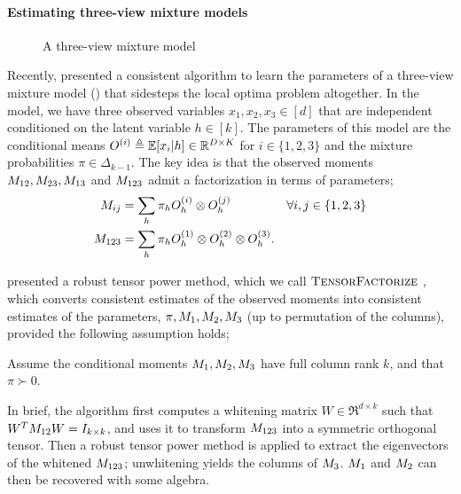 \paragraph{Estimating three-view mixture models}

\begin{figure}[t]
  \label{fig:three-view}
  \centering
  
  \caption{A three-view mixture model}
\end{figure}

Recently, \citet{anandkumar12moments} presented a consistent algorithm
  to learn the parameters of a three-view mixture model
  () that sidesteps the local optima problem
  altogether. 
In the model, we have three observed variables $x_1, x_2, x_3 \in [d]$
  that are independent conditioned on the latent variable $h \in [k]$. 
  The parameters of this model are the conditional means $O^{(i)} \triangleq
  \mathbb{E}[x_i | h] \in \mathbb{R}^{D \times K}$ for $i \in \{1,2,3\}$ and the mixture probabilities $\pi
  \in \Delta_{k-1}$.
  The key idea is that the observed moments $M_{12}, M_{23}, M_{13}$ and
  $M_{123}$ admit a factorization in terms of parameters;
\begin{align*}
  M_{ij} &= \sum_h \pi_h O^{(i)}_h \otimes O^{(j)}_h & \forall i,j \in \{1,2,3\} \\
  M_{123} &= \sum_h \pi_h O^{(1)}_h \otimes O^{(2)}_h \otimes O^{(3)}_h.
\end{align*}

\citet{anandkumar13tensor} presented a robust tensor power method, which
  we call $\textsc{TensorFactorize}~$, which converts consistent estimates of the observed moments 
  into consistent estimates of the parameters,
  $\pi, M_1, M_2, M_3$ (up to permutation of the columns), provided
  the following assumption holds;

\begin{assumption}
\label{asm:full-rank}
Assume the conditional moments $M_1, M_2, M_3$ have full column rank
  $k$, and that $\pi \succ 0$.
\end{assumption}

In brief, the algorithm first computes a whitening matrix $W \in
  \Re^{d \times k}$ such that $W^T M_{12} W = I_{k \times k}$,
  and uses it to transform $M_{123}$ into a symmetric orthogonal tensor.  
Then a robust tensor power method is applied to extract the eigenvectors
  of the whitened $M_{123}$; unwhitening yields the columns of $M_{3}$.
$M_1$ and $M_2$ can then be recovered with some algebra.


